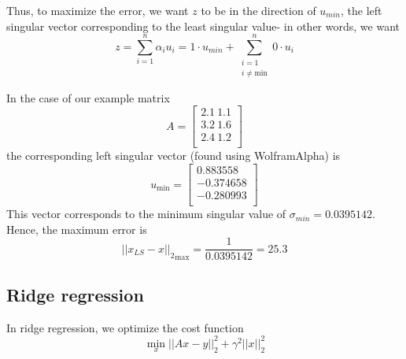 \documentclass[paper=a4, fontsize=11pt]{scrartcl} %
\numberwithin{equation}{section} %
\numberwithin{figure}{section} %
\numberwithin{table}{section} %
\begin{document}
Thus, to maximize the error, we want $z$ to be in the direction of $u_{min}$, the left singular vector corresponding to the least singular value- in other words, we want
\[z = \sum_{i = 1}^{n}\alpha_i u_i = 1\cdot u_{min} + \sum_{\begin{matrix} i=1 \\ i \ne \text{min} \end{matrix}}^n 0 \cdot u_i\]

In the case of our example matrix
\[ A =
\left[
\begin{matrix}
2.1 \ 1.1 \\
3.2 \ 1.6 \\
2.4 \ 1.2 \\
\end{matrix}
\right]
\]
the corresponding left singular vector (found using WolframAlpha) is 
\[ u_{\text{min}} =
\left[
\begin{matrix}
0.883558 \\
-0.374658 \\
-0.280993 \\
\end{matrix}
\right]
\]
This vector corresponds to the minimum singular value of $\sigma_{min} = 0.0395142$. Hence, the maximum error is
\[{||x_{LS} - x||_2}_{\text{max}} = \frac{1}{0.0395142} = 25.3\]

\subsection{Ridge regression}

In ridge regression, we optimize the cost function
\[\min_x ||Ax - y||_2^2 + \gamma^2 ||x||_2^2\]
\end{document}
